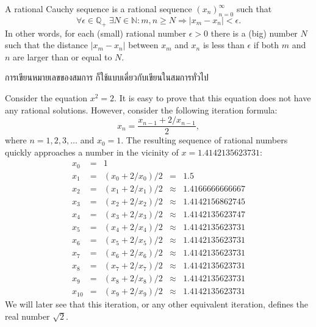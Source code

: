 \begin{definition}
  \label{th:rationalcauchysequence}
  A rational Cauchy sequence is a rational sequence
  $(x_n)_{n=0}^{\infty}$ such that
  \begin{equation}
    \forall \epsilon \in \mathbb{Q}_+ \;
    \exists N \in \mathbb{N} : m, n \geq N \Rightarrow |x_m - x_n| < \epsilon.
  \end{equation}
  In other words, for each (small) rational number $\epsilon > 0$
  there is a (big) number $N$ such that the distance $|x_m - x_n|$
  between $x_m$ and $x_n$ is less than $\epsilon$ if both $m$ and $n$
  are larger than or equal to $N$.
\end{definition}

\begin{remark}
 การเขียนหมายเลขของสมการ ก็ใช้แบบเดี่ยวกับเขียนในสมการทั่วไป
 \end{remark}

\begin{example}[แก้สมการ $x^2 = 2$]
  Consider the equation $x^2 = 2$. It is easy to prove that this
  equation does not have any rational solutions. However, consider
  the following iteration formula:
  \begin{equation}
    x_n = \frac{x_{n-1} + 2 / x_{n - 1}}{2},
  \end{equation}
  where $n = 1,2,3,\ldots$ and $x_0 = 1$. The resulting sequence of
  rational numbers quickly approaches a number in the vicinity of
  $x = 1.4142135623731$:
  \begin{displaymath}
    \begin{array}{rclcl}
      x_0 &=& 1 \\
      x_{1} &=& (x_{0} + 2 / x_{0}) / 2 &=& 1.5 \\
      x_{2} &=& (x_{1} + 2 / x_{1}) / 2 &\approx& 1.4166666666667 \\
      x_{3} &=& (x_{2} + 2 / x_{2}) / 2 &\approx& 1.4142156862745 \\
      x_{4} &=& (x_{3} + 2 / x_{3}) / 2 &\approx& 1.4142135623747 \\
      x_{5} &=& (x_{4} + 2 / x_{4}) / 2 &\approx& 1.4142135623731 \\
      x_{6} &=& (x_{5} + 2 / x_{5}) / 2 &\approx& 1.4142135623731 \\
      x_{7} &=& (x_{6} + 2 / x_{6}) / 2 &\approx& 1.4142135623731 \\
      x_{8} &=& (x_{7} + 2 / x_{7}) / 2 &\approx& 1.4142135623731 \\
      x_{9} &=& (x_{8} + 2 / x_{8}) / 2 &\approx& 1.4142135623731 \\
      x_{10} &=& (x_{9} + 2 / x_{9}) / 2 &\approx& 1.4142135623731
    \end{array}
  \end{displaymath}
  We will later see that this iteration, or any other equivalent
  iteration, defines the real number $\sqrt{2}$.
\end{example}

